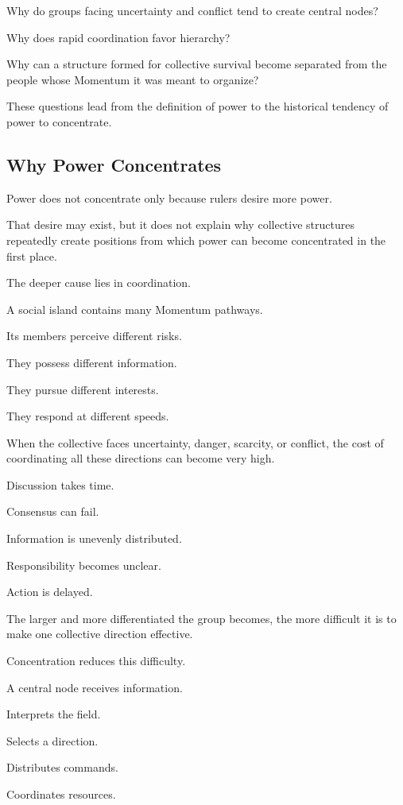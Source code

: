 Why do groups facing uncertainty and conflict tend to create central nodes?

Why does rapid coordination favor hierarchy?

Why can a structure formed for collective survival become separated from the people whose Momentum it was meant to organize?

These questions lead from the definition of power to the historical tendency of power to concentrate.

\subsection*{\textbf{Why Power Concentrates}}


Power does not concentrate only because rulers desire more power.

That desire may exist, but it does not explain why collective structures repeatedly create positions from which power can become concentrated in the first place.

The deeper cause lies in coordination.

A social island contains many Momentum pathways.

Its members perceive different risks.

They possess different information.

They pursue different interests.

They respond at different speeds.

When the collective faces uncertainty, danger, scarcity, or conflict, the cost of coordinating all these directions can become very high.

Discussion takes time.

Consensus can fail.

Information is unevenly distributed.

Responsibility becomes unclear.

Action is delayed.

The larger and more differentiated the group becomes, the more difficult it is to make one collective direction effective.

Concentration reduces this difficulty.

A central node receives information.

Interprets the field.

Selects a direction.

Distributes commands.

Coordinates resources.

